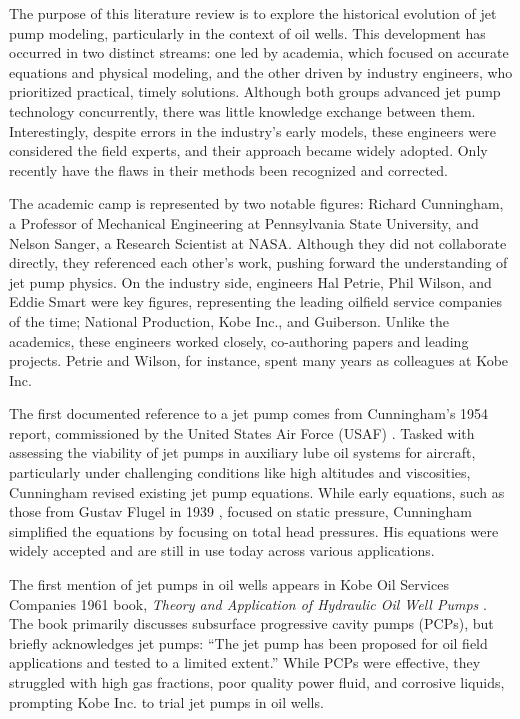 \documentclass[../ellis_thesis.tex]{subfiles}
\begin{document}

The purpose of this literature review is to explore the historical evolution of jet pump modeling, particularly in the context of oil wells. This development has occurred in two distinct streams: one led by academia, which focused on accurate equations and physical modeling, and the other driven by industry engineers, who prioritized practical, timely solutions. Although both groups advanced jet pump technology concurrently, there was little knowledge exchange between them. Interestingly, despite errors in the industry's early models, these engineers were considered the field experts, and their approach became widely adopted. Only recently have the flaws in their methods been recognized and corrected.

The academic camp is represented by two notable figures: Richard Cunningham, a Professor of Mechanical Engineering at Pennsylvania State University, and Nelson Sanger, a Research Scientist at NASA. Although they did not collaborate directly, they referenced each other's work, pushing forward the understanding of jet pump physics. On the industry side, engineers Hal Petrie, Phil Wilson, and Eddie Smart were key figures, representing the leading oilfield service companies of the time; National Production, Kobe Inc., and Guiberson. Unlike the academics, these engineers worked closely, co-authoring papers and leading projects. Petrie and Wilson, for instance, spent many years as colleagues at Kobe Inc.

The first documented reference to a jet pump comes from Cunningham’s 1954 report, commissioned by the United States Air Force (USAF) \cite{cunn_oil}. Tasked with assessing the viability of jet pumps in auxiliary lube oil systems for aircraft, particularly under challenging conditions like high altitudes and viscosities, Cunningham revised existing jet pump equations. While early equations, such as those from Gustav Flugel in 1939 \cite{flugel}, focused on static pressure, Cunningham simplified the equations by focusing on total head pressures. His equations were widely accepted and are still in use today across various applications.

The first mention of jet pumps in oil wells appears in Kobe Oil Services Companies 1961 book, \emph{Theory and Application of Hydraulic Oil Well Pumps} \cite{kobe_book}. The book primarily discusses subsurface progressive cavity pumps (PCPs), but briefly acknowledges jet pumps: “The jet pump has been proposed for oil field applications and tested to a limited extent.” While PCPs were effective, they struggled with high gas fractions, poor quality power fluid, and corrosive liquids, prompting Kobe Inc. to trial jet pumps in oil wells.
\end{document}
